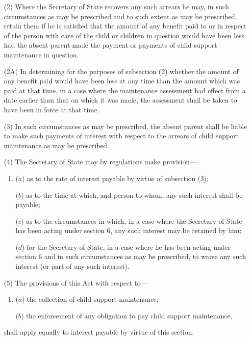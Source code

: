 \documentclass[12pt,a4paper]{article}
\begin{document}

(2) Where the Secretary of State recovers any such arrears he may, in such circumstances as may be prescribed and to such extent as may be prescribed, retain them if he is satisfied that the amount of any benefit paid to or in respect of the person with care of the child or children in question would have been less had the absent parent made the payment or payments of child support maintenance in question.

(2A) In determining for the purposes of subsection (2) whether the amount of any benefit paid would have been less at any time than the amount which was paid at that time, in a case where the maintenance assessment had effect from a date earlier than that on which it was made, the assessment shall be taken to have been in force at that time.

(3) In such circumstances as may be prescribed, the absent parent shall be liable to make such payments of interest with respect to the arrears of child support maintenance as may be prescribed.

(4) The Secretary of State may by regulations make provision—
\begin{enumerate}\item[]
($a$) as to the rate of interest payable by virtue of subsection (3);

($b$) as to the time at which, and person to whom, any such interest shall be payable;

($c$) as to the circumstances in which, in a case where the Secretary of State has been acting under section 6, any such interest may be retained by him;

($d$) for the Secretary of State, in a case where he has been acting under section 6 and in such circumstances as may be prescribed, to waive any such interest (or part of any such interest).
\end{enumerate}

(5) The provisions of this Act with respect to—
\begin{enumerate}\item[]
($a$) the collection of child support maintenance;

($b$) the enforcement of any obligation to pay child support maintenance,
\end{enumerate}
shall apply equally to interest payable by virtue of this section.
\end{document}
